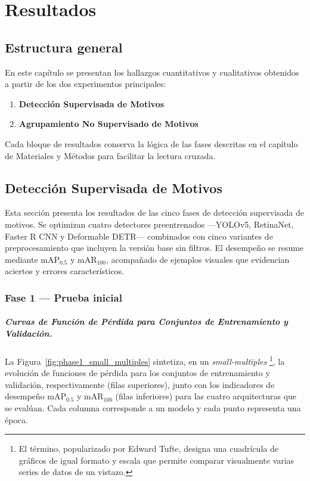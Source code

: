 \chapter{Resultados}\label{ch:resultados}

\section{Estructura general}
En este capítulo se presentan los hallazgos cuantitativos y cualitativos obtenidos a partir de los dos experimentos principales:

\begin{enumerate}
  \item \textbf{Detección Supervisada de Motivos}
  \item \textbf{Agrupamiento No Supervisado de Motivos}
\end{enumerate}

Cada bloque de resultados conserva la lógica de las fases descritas en el capítulo de Materiales y Métodos para facilitar la lectura cruzada.

\section{Detección Supervisada de Motivos}

Esta sección presenta los resultados de las cinco fases de detección supervisada de motivos.
Se optimizan cuatro detectores preentrenados —YOLOv5, RetinaNet, Faster R CNN y Deformable DETR— combinados con cinco variantes de preprocesamiento que incluyen la versión base sin filtros.
El desempeño se resume mediante mAP$_{0.5}$ y mAR$_{100}$, acompañado de ejemplos visuales que evidencian aciertos y errores característicos.

\subsection{Fase 1 — Prueba inicial}
\label{ssec:fase1}

\paragraph{Curvas de Función de Pérdida para Conjuntos de Entrenamiento y Validación.}
La Figura~\ref{fig:phase1_small_multiples} sintetiza, en un \emph{small-multiples} \footnote{El término, popularizado por Edward Tufte, designa una cuadrícula de gráficos de igual formato y escala que permite comparar visualmente varias series de datos de un vistazo.}, la evolución de funciones de pérdida para los conjuntos de entrenamiento y validación, respectivamente (filas superiores), junto con los indicadores de desempeño mAP$_{0.5}$ y mAR$_{100}$ (filas inferiores) para las cuatro arquitecturas que se evalúan.
Cada columna corresponde a un modelo y cada punto representa una época.


